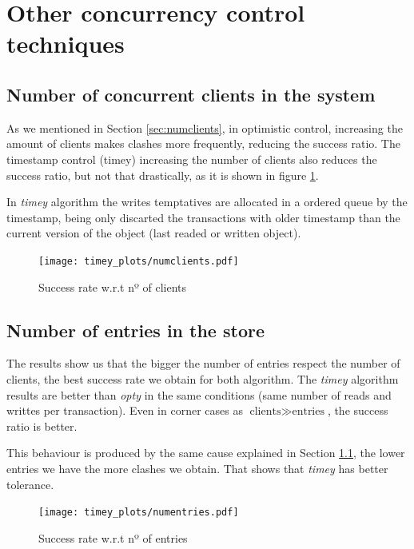 \documentclass[a4paper, 10pt]{article}
\begin{document}
\clearpage
\section{Other concurrency control techniques}


\subsection{Number of concurrent clients in the system}\label{timey-current-clients}

As we mentioned in Section \ref{sec:numclients}, in optimistic control, increasing the amount of clients makes clashes more frequently, reducing the success ratio. The timestamp control (timey) increasing the number of clients also reduces the success ratio, but not that drastically, as it is shown in figure \ref{timey:numclients}. 

In \textit{timey} algorithm the writes temptatives are allocated in a ordered queue by the timestamp, being only discarted the transactions with older timestamp than the current version of the object (last readed or written object).

\begin{figure}[H]
  \centering
  \texttt{[image: timey\_plots/numclients.pdf]}
    \caption{Success rate w.r.t nº of clients}
    \label{timey:numclients}
\end{figure} 

\clearpage
\subsection{Number of entries in the store}

The results show us that the bigger the number of entries respect the number of clients, the best success rate we obtain for both algorithm. The \textit{timey} algorithm results are better than \textit{opty} in the same conditions (same number of reads and writtes per transaction). Even in corner cases as $\text{clients} \gg \text{entries}$, the success ratio is better. 

This behaviour is produced by the same cause explained in Section \ref{timey-current-clients}, the lower entries we have the more clashes we obtain. That shows that \textit{timey} has better tolerance.

\begin{figure}[H]
  \centering
  \texttt{[image: timey\_plots/numentries.pdf]}
    \caption{Success rate w.r.t nº of entries}
    \label{timey:numentries}
\end{figure} 
\end{document}
